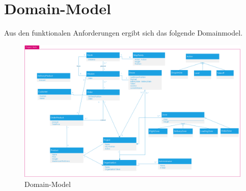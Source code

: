 \section{Domain-Model}
Aus den funktionalen Anforderungen ergibt sich das folgende Domainmodel.
\begin{landscape}
\begin{figure}[h]
	\includegraphics[width=0.75\paperheight]{images/domainmodell.png}
	\caption{Domain-Model}
	\label{fig:domain-model}
\end{figure}
\end{landscape}

